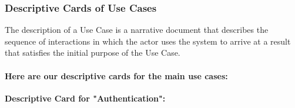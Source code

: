 \documentclass{article}
\begin{document}
\newpage
\subsubsection*{Descriptive Cards of Use Cases}

The description of a Use Case is a narrative document that describes the sequence of interactions in which the actor uses the system to arrive at a result that satisfies the initial purpose of the Use Case.

\noindent\paragraph*{Here are our descriptive cards for the main use cases:}

\textbf{Descriptive Card for "Authentication":}
\end{document}
